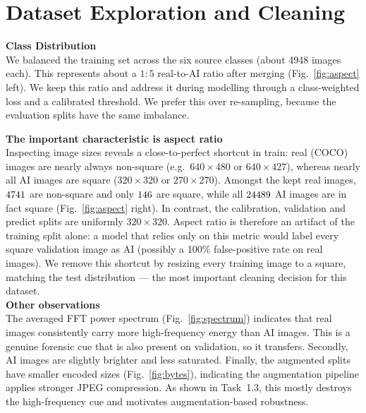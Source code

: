 \section{Dataset Exploration and Cleaning}
\textbf{Class Distribution} \\
We balanced the training set across the six source
classes (about 4948 images each). This represents about a $1{:}5$ real-to-AI
ratio after merging (Fig.~\ref{fig:aspect} left). We keep this ratio and address
it during modelling through a class-weighted loss and a calibrated threshold. We
prefer this over re-sampling, because the evaluation splits have the same
imbalance.

\textbf{The important characteristic is aspect ratio} \\
Inspecting image sizes
reveals a close-to-perfect shortcut in train: real (COCO) images are nearly
always non-square (e.g.\ $640{\times}480$ or $640{\times}427$), whereas nearly
all AI images are square ($320{\times}320$ or $270{\times}270$). Amongst the
kept real images, $4741$ are non-square and only $146$ are
square, while all $24489$ AI images are in fact square
(Fig.~\ref{fig:aspect} right). In contrast, the calibration, validation and
predict splits are uniformly $320{\times}320$. Aspect ratio is therefore an
artifact of the training split alone: a model that relies only on this metric
would label every square validation image as AI (possibly a 100\% false-positive
rate on real images). We remove this shortcut by resizing every training image
to a square, matching the test distribution --- the most important cleaning
decision for this dataset.\\
\textbf{Other observations}\\
The averaged FFT power spectrum
(Fig.~\ref{fig:spectrum}) indicates that real images consistently carry more
high-frequency energy than AI images. This is a genuine forensic cue that is
also present on validation, so it transfers. Secondly, AI images are slightly
brighter and less saturated. Finally, the augmented splits have smaller encoded
sizes (Fig.~\ref{fig:bytes}), indicating the augmentation pipeline applies
stronger JPEG compression. As shown in Task~1.3, this mostly destroys the
high-frequency cue and motivates augmentation-based robustness.

